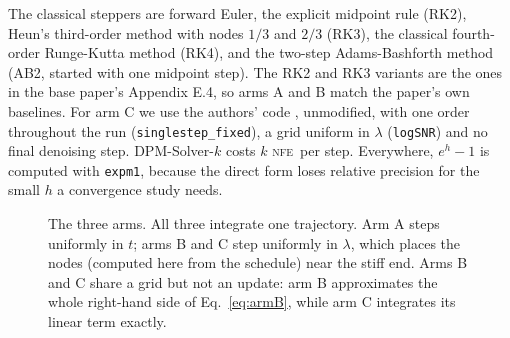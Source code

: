 \documentclass[sigconf]{acmart}
\newcommand{\NFE}{\textsc{nfe}}
\newcommand{\lam}{\lambda}
\newcommand{\tend}{t_{\text{end}}}
\begin{document}
The classical steppers are forward Euler, the explicit midpoint rule (RK2),
Heun's third-order method with nodes $1/3$ and $2/3$ (RK3), the classical
fourth-order Runge-Kutta method (RK4), and the two-step Adams-Bashforth method
(AB2, started with one midpoint step). The RK2 and RK3 variants are the ones in
the base paper's Appendix E.4, so arms A and B match the paper's own baselines.
For arm C we use the authors' code \cite{lu2022code}, unmodified, with one
order throughout the run (\texttt{singlestep\_fixed}), a grid uniform in $\lam$
(\texttt{logSNR}) and no final denoising step. DPM-Solver-$k$ costs $k$ \NFE\
per step. Everywhere, $e^{h}-1$ is computed with \texttt{expm1}, because the
direct form loses relative precision for the small $h$ a convergence study
needs.

\begin{figure}[t]
\centering
{}
\caption{The three arms. All three integrate one trajectory. Arm A steps
uniformly in $t$; arms B and C step uniformly in $\lam$, which places the nodes
(computed here from the schedule) near the stiff end. Arms B and C share a grid
but not an update: arm B approximates the whole right-hand side of
Eq.~\eqref{eq:armB}, while arm C integrates its linear term exactly.}
\label{fig:arms}
\end{figure}
\end{document}
